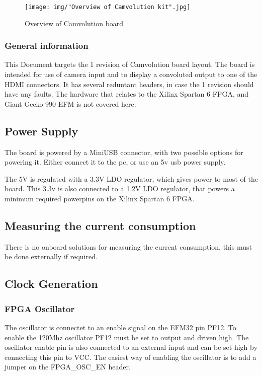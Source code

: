 \begin{figure}
    \texttt{[image: img/"Overview of Camvolution kit".jpg]}
    \caption{Overview of Camvolution board}
    \label{fig:board_layout}
\end{figure}

\subsubsection{General information}
This Document targets the 1 revision of Camvolution board layout. The board is intended for use of camera input and to display a convoluted output to one of the HDMI connectors. It has several reduntant headers, in case the 1 revision should have any faults. The hardware that relates to the Xilinx Spartan 6 FPGA, and Giant Gecko 990 EFM is not covered here.

\subsection{Power Supply}
The board is powered by a MiniUSB connector, with two possible options for powering it. Either connect it to the pc, or use an 5v usb power supply.

The 5V is regulated with a 3.3V LDO regulator, which gives power to most of the board. This 3.3v is also connected to a 1.2V LDO regulator, that powers a minimum required powerpins on the Xilinx Spartan 6 FPGA. 

\subsection{Measuring the current consumption}
There is no onboard solutions for measuring the current consumption, this must be done externally if required. 

\subsection{Clock Generation}
\subsubsection{FPGA Oscillator}The oscillator is connectet to an enable signal on the EFM32 pin PF12. To enable the 120Mhz oscillator PF12 must be set to output and driven high. The oscillator enable pin is also connected to an external input and can be set high by connecting this pin to VCC. The easiest way of enabling the oscillator is to add a jumper on the FPGA\_OSC\_EN header.
\newline
